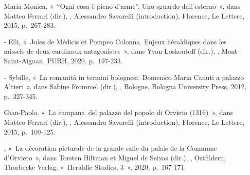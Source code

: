 \begin{teiElement}[name={TEI},change={commons\_edition}]
\begin{teiElement}[name={text},type={book},xmlid={book}]
\begin{teiElement}[name={group},type={book},xmlid={book-001}]
\begin{teiElement}[name={group},type={bibliography},data-page-title={Sources et bibliographie},data-include-href={Ch14\_Source\_bibliographie.xml},xmlid={bibliography-001}]
\begin{teiElement}[name={body}]
\begin{teiDiv}[type={section1},xmlid={div18}]
\begin{teiDiv}[type={section2},xmlid={div19}]
\begin{teiBibl}[xmlid={bibl-359}]
 Maria Monica, « “Ogni cosa è pieno d’arme”. Uno sguardo dall’esterno », dans Matteo Ferrari (dir.), , Alessandro Savorelli (introduction), Florence, Le Lettere, 2015, p. 267-283.
\end{teiBibl}
              \begin{teiBibl}[xmlid={bibl-360}]
- Elli, « Jules de Médicis et Pompeo Colonna. Enjeux héraldiques dans les missels de deux cardinaux antagonistes », dans Yvan Loskoutoff (dir.), , Mont-Saint-Aignan, PURH, 2020, p. 197-233.
\end{teiBibl}
              \begin{teiBibl}[xmlid={bibl-361}]
- Sybille, « La romanità in termini bolognesi: Domenico Maria Canuti a palazzo Altieri », dans Sabine Frommel (dir.), , Bologne, Bologna University Press, 2012, p. 327-345.
\end{teiBibl}
              \begin{teiBibl}[xmlid={bibl-362}]
 Gian-Paolo, « La campana del palazzo del popolo di Orvieto (1316) », dans Matteo Ferrari (dir.), , Alessandro Savorelli (introduction), Florence, Le Lettere, 2015, p. 109-125.
\end{teiBibl}
              \begin{teiBibl}[xmlid={bibl-363}]
, « La décoration picturale de la grande salle du palais de la Commune d’Orvieto », dans Torsten Hiltman et Miguel de Seixas (dir.), , Ostfildern, Thorbecke Verlag, « Heraldic Studies, 3 », 2020, p. 167-171.
\end{teiBibl}
              \begin{teiBibl}[xmlid={bibl-364}]

\end{teiBibl}
\end{teiDiv}
\end{teiDiv}
\end{teiElement}
\end{teiElement}
\end{teiElement}
\end{teiElement}
\end{teiElement}

